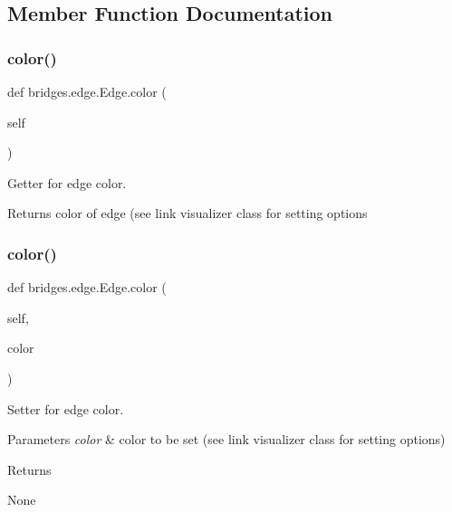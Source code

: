\subsection{Member Function Documentation}
\mbox{\label{classbridges_1_1edge_1_1_edge_a24a4845aeae4ca6fc432b6d0b7fa78c2}} 
\subsubsection{\texorpdfstring{color()}{color()}\hspace{0.1cm}{\footnotesize\ttfamily [1/2]}}
{\footnotesize\ttfamily def bridges.\+edge.\+Edge.\+color (\begin{DoxyParamCaption}\item[{}]{self }\end{DoxyParamCaption})}



Getter for edge color. 

\begin{DoxyReturn}{Returns}
color of edge (see link visualizer class for setting options 
\end{DoxyReturn}
\mbox{\label{classbridges_1_1edge_1_1_edge_a81ccb5ffd5838829e1a2217846c4df77}} 
\subsubsection{\texorpdfstring{color()}{color()}\hspace{0.1cm}{\footnotesize\ttfamily [2/2]}}
{\footnotesize\ttfamily def bridges.\+edge.\+Edge.\+color (\begin{DoxyParamCaption}\item[{}]{self,  }\item[{}]{color }\end{DoxyParamCaption})}



Setter for edge color. 


\begin{DoxyParams}{Parameters}
{\em color} & color to be set (see link visualizer class for setting options) \\
\hline
\end{DoxyParams}
\begin{DoxyReturn}{Returns}


None 
\end{DoxyReturn}
\mbox{\label{classbridges_1_1edge_1_1_edge_aec8b0dbb915416ac8504684a2b3f6fe4}} 
